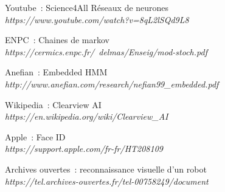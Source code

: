 \documentclass[12pt,french]{article}
\theoremstyle{plain}
\theoremstyle{definition}
\begin{document}
\begin{thebibliography}{18}
\bibitem{}
  Youtube~: Science4All Réseaux de neurones
  \\\textit{https://www.youtube.com/watch?v=8qL2lSQd9L8}

\bibitem{}
  ENPC~: Chaines de markov
  \\\textit{https://cermics.enpc.fr/~delmas/Enseig/mod-stoch.pdf}

\bibitem{}
  Anefian~: Embedded HMM
  \\\textit{http://www.anefian.com/research/nefian99\_embedded.pdf}

\bibitem{}
  Wikipedia~: Clearview AI
  \\\textit{https://en.wikipedia.org/wiki/Clearview\_AI}

\bibitem{}
  Apple~: Face ID
  \\\textit{https://support.apple.com/fr-fr/HT208109}

\bibitem{}
  Archives ouvertes~: reconnaissance visuelle d'un robot
  \\\textit{https://tel.archives-ouvertes.fr/tel-00758249/document}

\end{thebibliography}
\end{document}
